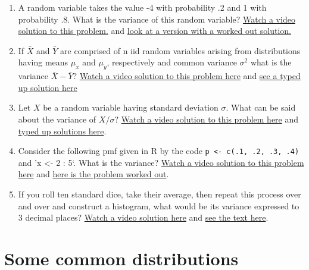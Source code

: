 \documentclass[]{article}
\begin{document}
\begin{enumerate}
\def\labelenumi{\arabic{enumi}.}
\setcounter{enumi}{4}
\itemsep1pt\parskip0pt
\item
  A random variable takes the value -4 with probability .2 and 1 with
  probability .8. What is the variance of this random variable?
  \href{http://youtu.be/Em-xJeQO1rc?list=PLpl-gQkQivXhHOcVeU3bSJg78zaDYbP9L}{Watch
  a video solution to this problem.} and
  \href{http://bcaffo.github.io/courses/06_StatisticalInference/homework/hw1.html\#6}{look
  at a version with a worked out solution.}
\item
  If $\bar X$ and $\bar Y$ are comprised of n iid random variables
  arising from distributions having means $\mu_x$ and $\mu_y$,
  respectively and common variance $\sigma^2$ what is the variance
  $\bar X - \bar Y$?
  \href{http://youtu.be/7zJhPzX6jns?list=PLpl-gQkQivXhHOcVeU3bSJg78zaDYbP9L}{Watch
  a video solution to this problem here} and
  \href{http://bcaffo.github.io/courses/06_StatisticalInference/homework/hw1.html\#7}{see
  a typed up solution here}
\item
  Let $X$ be a random variable having standard deviation $\sigma$. What
  can be said about the variance of $X /\sigma$?
  \href{http://youtu.be/0WUj18_BUPA?list=PLpl-gQkQivXhHOcVeU3bSJg78zaDYbP9L}{Watch
  a video solution to this problem here} and
  \href{http://bcaffo.github.io/courses/06_StatisticalInference/homework/hw1.html\#8}{typed
  up solutions here}.
\item
  Consider the following pmf given in R by the code
  \texttt{p \textless{}- c(.1, .2, .3, .4)} and 'x \textless{}- 2 : 5`.
  What is the variance?
  \href{http://youtu.be/HSn8n4DsGSg?list=PLpl-gQkQivXhHOcVeU3bSJg78zaDYbP9L}{Watch
  a video solution to this problem here} and
  \href{http://bcaffo.github.io/courses/06_StatisticalInference/homework/hw1.html\#10}{here
  is the problem worked out}.
\item
  If you roll ten standard dice, take their average, then repeat this
  process over and over and construct a histogram, what would be its
  variance expressed to 3 decimal places?
  \href{https://www.youtube.com/watch?v=MLfo9zz1zX4\&list=PLpl-gQkQivXhHOcVeU3bSJg78zaDYbP9L\&index=17}{Watch
  a video solution here} and
  \href{http://bcaffo.github.io/courses/06_StatisticalInference/homework/hw2.html\#12}{see
  the text here}.
\end{enumerate}

\newpage

\section{Some common distributions}\label{some-common-distributions}
\end{document}
